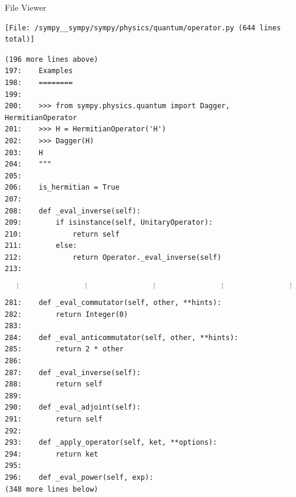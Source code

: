 \begin{center}
\centering
\begin{fileviewerbox}{File Viewer}
\begin{Verbatim}[breaklines=true]
[File: /sympy__sympy/sympy/physics/quantum/operator.py (644 lines total)]
\end{Verbatim}
\begin{Verbatim}
(196 more lines above)
197:    Examples
198:    ========
199:
200:    >>> from sympy.physics.quantum import Dagger, HermitianOperator
201:    >>> H = HermitianOperator('H')
202:    >>> Dagger(H)
203:    H
204:    """
205:
206:    is_hermitian = True
207:
208:    def _eval_inverse(self):
209:        if isinstance(self, UnitaryOperator):
210:            return self
211:        else:
212:            return Operator._eval_inverse(self)
213:
\end{Verbatim}
$$
\vdots\qquad\qquad\qquad\qquad
\vdots\qquad\qquad\qquad\qquad
\vdots\qquad\qquad\qquad\qquad
\vdots\qquad\qquad\qquad\qquad
\vdots
$$
\begin{Verbatim}[breaklines=true]
281:    def _eval_commutator(self, other, **hints):
282:        return Integer(0)
283:
284:    def _eval_anticommutator(self, other, **hints):
285:        return 2 * other
286:
287:    def _eval_inverse(self):
288:        return self
289:
290:    def _eval_adjoint(self):
291:        return self
292:
293:    def _apply_operator(self, ket, **options):
294:        return ket
295:
296:    def _eval_power(self, exp):
(348 more lines below)
\end{Verbatim}
\end{fileviewerbox}
    \label{fig:appx:file_viewer} 
\end{center}
